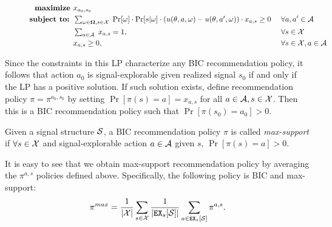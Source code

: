 \begin{figure}[H]
\begin{mdframed}
\vspace{-5mm}
\begin{alignat*}{2}
\textbf{maximize }   & x_{a_0,s_0}\  \\
\textbf{subject to: }
    & \textstyle \sum_{\omega \in \varOmega, s \in \X} \;
    \Pr[\omega] \cdot \Pr[s | \omega] \cdot
        \left(u(\theta, a, \omega) - u(\theta, a', \omega)\right) \cdot x_{a,s} \geq 0   &\ & \forall a,a' \in \A \\
    & \textstyle \sum_{a\in \A}\; x_{a,s} = 1,  \ &\ & \forall s \in \X \\
    & x_{a,s} \geq 0,  \ &\ & \forall s \in \X, a\in \A
\end{alignat*}
\end{mdframed}
\label{fig:public_lp}
\end{figure}

Since the constraints in this LP characterize any BIC recommendation policy, it follows that action $a_0$ is signal-explorable given realized signal $s_0$ if and only if the LP has a positive solution. If such solution exists, define recommendation policy $\pi = \pi^{a_0,s_0}$ by setting
    $\Pr[\pi(s) = a] = x_{a,s}$ for all $a\in \A, s\in \X$.
Then this is a BIC recommendation policy such that
    $\Pr[\pi(s_0) = a_0] > 0$.

\begin{definition}
Given a signal structure $\S$, a BIC recommendation policy $\pi$ is called  \emph{max-support} if $\forall s \in \X$  and signal-explorable action $a\in \A$ given $s$, $\Pr[\pi(s) = a] > 0$.
\end{definition}


It is easy to see that we obtain max-support recommendation policy by averaging the $\pi^{a,s}$ policies defined above. Specifically, the following policy is BIC and max-support:
\begin{align}\label{eq:pimax}
\pi^{max} = \frac{1}{|\X|} \sum_{s \in \X} \frac{1}{|\EX_s[\S]|} \sum_{a \in \EX_s[\S]} \pi^{a,s}.
\end{align}

%

